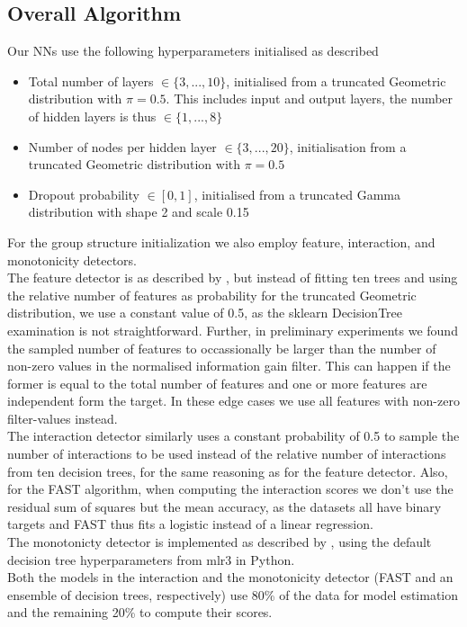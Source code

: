 \documentclass[twoside,11pt]{article}
\begin{document}
\subsection{Overall Algorithm}
Our NNs use the following hyperparameters initialised as described
\begin{itemize}
  \item Total number of layers $\in\{3, ..., 10\}$, initialised from a truncated Geometric distribution with $\pi=0.5$.
        This includes input and output layers, the number of hidden layers is thus $\in\{1, ..., 8\}$
  \item Number of nodes per hidden layer $\in\{3, ..., 20\}$, initialisation from a truncated Geometric distribution with $\pi=0.5$
  \item Dropout probability $\in[0, 1]$, initialised from a truncated Gamma distribution with shape 2 and scale 0.15
\end{itemize}
For the group structure initialization we also employ feature, interaction, and monotonicity detectors.
\\
The feature detector is as described by \citet[p. 542]{EAGGA}, but instead of fitting ten trees and using the relative number of features as
probability for the truncated Geometric distribution, we use a constant value of 0.5, as the sklearn DecisionTree examination is not straightforward.
Further, in preliminary experiments we found the sampled number of features to occassionally be larger than the number of non-zero values in the
normalised information gain filter. This can happen if the former is equal to the total number of features and one or more features are independent form the
target. In these edge cases we use all features with non-zero filter-values instead.
\\
The interaction detector similarly uses a constant probability of 0.5 to sample the number of interactions to be used instead of the relative number of interactions
from ten decision trees, for the same reasoning as for the feature detector. Also, for the FAST algorithm, when computing the interaction scores we don't
use the residual sum of squares but the mean accuracy, as the datasets all have binary targets and FAST thus fits a logistic instead of a linear regression.
\\
The monotonicty detector is implemented as described by \citet[p. 543]{EAGGA}, using the default decision tree hyperparameters from mlr3 in Python.
\\
Both the models in the interaction and the monotonicity detector (FAST and an ensemble of decision trees, respectively) use 80\% of the data for model estimation and
the remaining 20\% to compute their scores.
\end{document}
